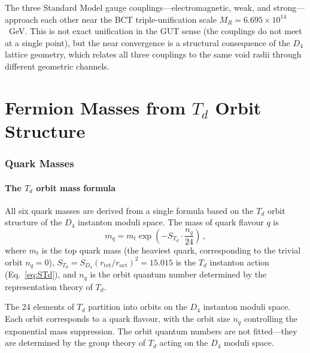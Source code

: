 \documentclass[review,number,sort&compress]{elsarticle}
\newcommand{\roct}{r_{\mathrm{oct}}}
\newcommand{\rtet}{r_{\mathrm{tet}}}
\newcommand{\SD}{S_{D_4}}
\newcommand{\STd}{S_{T_d}}
\newcommand{\MR}{M_R}
\newcommand{\Td}{T_d}
\newcommand{\Dfour}{D_4}
\begin{document}
The three Standard Model gauge couplings---electromagnetic, weak, and
strong---approach each other near the BCT triple-unification scale
$\MR = 6.695 \times 10^{14}$~GeV. This is not exact unification in the
GUT sense (the couplings do not meet at a single point), but the near
convergence is a structural consequence of the $\Dfour$ lattice geometry,
which relates all three couplings to the same void radii through
different geometric channels.


\part{Fermion Masses from $\Td$ Orbit Structure}
\label{part:fermions}

\section{Quark Masses}
\label{sec:quarks}

\subsection{The $\Td$ orbit mass formula}

All six quark masses are derived from a single formula based on the
$\Td$ orbit structure of the $\Dfour$ instanton moduli space. The mass
of quark flavour $q$ is
\begin{equation}
  m_q = m_t \exp\!\left(-\STd \cdot \frac{n_q}{24}\right)\,,
  \label{eq:quark_mass}
\end{equation}
where $m_t$ is the top quark mass (the heaviest quark, corresponding to
the trivial orbit $n_q = 0$), $\STd = \SD(\rtet/\roct)^2 = 15.015$ is
the $\Td$ instanton action (Eq.~\ref{eq:STd}), and $n_q$ is the orbit
quantum number determined by the representation theory of $\Td$.

The 24 elements of $\Td$ partition into orbits on the $\Dfour$ instanton
moduli space. Each orbit corresponds to a quark flavour, with the orbit
size $n_q$ controlling the exponential mass suppression. The orbit
quantum numbers are not fitted---they are determined by the group theory
of $\Td$ acting on the $\Dfour$ moduli space.
\end{document}
